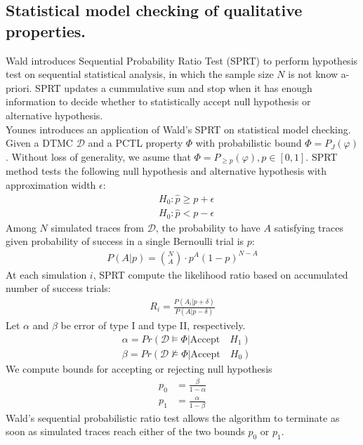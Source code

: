 \subsection{Statistical model checking of qualitative properties.}
Wald \cite{wald1945sequential} introduces Sequential Probability Ratio Test (SPRT) to perform
hypothesis test on sequential statistical analysis, in which the sample size $N$ is not know
a-priori. SPRT updates a cummulative sum and stop when it has enough information to decide whether
to statistically accept null hypothesis or alternative hypothesis.\\
Younes \cite{younes2002probabilistic} introduces an application of Wald's SPRT on statistical model
checking. Given a DTMC $\mathcal{D}$ and a PCTL property $\Phi$ with probabilistic bound $\Phi =
    P_J(\varphi)$. Without loss of generality, we asume that $\Phi = P_{\geq p}(\varphi),
    p\in[0,1]$. SPRT method tests the following null hypothesis and alternative hypothesis with
approximation width $\epsilon$:
\begin{align*}
     & H_0: \hat{p} \geq p + \epsilon \\
     & H_0: \hat{p} < p - \epsilon
\end{align*}
Among $N$ simulated traces from $\mathcal{D}$, the probability to have $A$ satisfying traces given
probability of success in a single Bernoulli trial is $p$:
\begin{align*}
    P(A | p) = {N \choose A} \cdot p^A(1-p)^{N-A}
\end{align*}
At each simulation $i$, SPRT compute the likelihood ratio based on accumulated number of success trials:
\begin{align*}
    R_i = \frac{P(A_i | p + \delta)}{P(A | p - \delta)}
\end{align*}
Let $\alpha$ and $\beta$ be error of type I and type II, respectively.
\begin{align*}
     & \alpha = Pr(\mathcal{D} \models \Phi | \text{Accept}\quad H_1) \\
     & \beta =  Pr(\mathcal{D} \nvDash \Phi | \text{Accept}\quad H_0)
\end{align*}
We compute bounds for accepting or rejecting null hypothesis
\begin{align*}
    p_0 & = \frac{\beta}{1 - \alpha} \\
    p_1 & = \frac{\alpha}{1 - \beta}
\end{align*}
Wald's sequential probabilistic ratio test allows the algorithm to terminate as soon as simulated
traces reach either of the two bounds $p_0$ or $p_1$.

